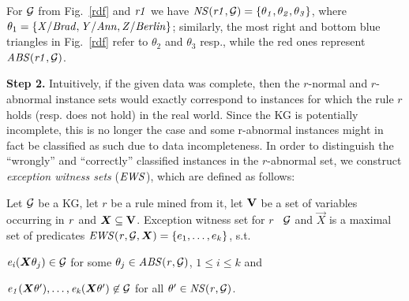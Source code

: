 \begin{example}\label{ex:abns}
For $\mathcal{G}$ from Fig.~\ref{rdf} and $\mathit{r1}$ 
we have $\mathit{NS(r1,\mathcal{G})}=\{\mathit{\theta_1,\theta_2,\theta_3}\}$, where $\theta_1=\{\mathit{X/Brad,Y/Ann,Z/Berlin}\}$; similarly, the most right and bottom blue triangles in Fig.~\ref{rdf} refer to $\theta_2$ and $\theta_3$ resp., while the red ones represent $\mathit{ABS(r1,\mathcal{G})}$.
\end{example}
 


\noindent \textbf{Step 2.} Intuitively, if the given data was complete, then the $r$-normal
and $r$-abnormal instance sets would exactly correspond to instances for which
the rule $r$ holds (resp. does not hold) in the real world. Since the KG is
potentially incomplete, this is no longer the case and some r-abnormal instances
might in fact be classified as such due to data incompleteness.  In order to
distinguish the ``wrongly'' and ``correctly'' classified instances in the
$r$-abnormal set, we construct \emph{exception witness sets} ($\mathit{EWS}$), which
are defined as follows:



\begin{definition} \label{def:ews}
Let $\mathcal{G}$ be a KG, let $r$ be a rule mined from it, let ${\mathbf V}$ be a set of variables occurring in $\mathit{r}$ and $\vec{X}\subseteq \cV$. Exception witness set for $r$ \wrt\ $\mathcal{G}$ and $\vec{X}$ is a maximal set of predicates $\mi{EWS(r,\cG,\vec{X})}=\{e_1,\dotsc,e_k\}$, s.t.
\begin{myitemize}
\item $\mi{e_i}(\vec{X}\theta_j)\in \cG$ for some $\theta_j\in \mathit{ABS(r,\mathcal{G})}$, $1 \leq i\leq k$ and
\item $\mi{e_1}(\vec{X}\theta'),\dotsc,\mi{e_k}(\vec{X}\theta')\not \in \cG$ for all $\theta' \in \mathit{NS(r,\mathcal{G})}$.
\end{myitemize}
\end{definition}

